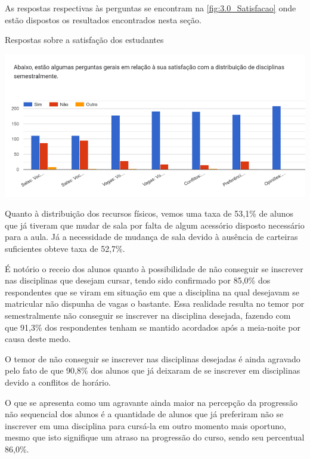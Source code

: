 As respostas respectivas às perguntas se encontram na \autoref{fig:3.0_Satisfacao} onde estão dispostos os resultados encontrados nesta seção.

\begin{MyCenteredFigure}
  \caption{Respostas sobre a satisfação dos estudantes}
  \label{fig:3.0_Satisfacao}
  \includegraphics[width=\textwidth]{files/img/2.02!3-organizacao/2.02!3.1.4-forms/3.0-Satisfacao}
\end{MyCenteredFigure} %

Quanto à distribuição dos recursos físicos, vemos uma taxa de 53,1\% de alunos que já tiveram que mudar de sala por falta de algum acessório disposto necessário para a aula. Já a necessidade de mudança de sala devido à ausência de carteiras suficientes obteve taxa de 52,7\%.

É notório o receio dos alunos quanto à possibilidade de não conseguir se inscrever nas disciplinas que desejam cursar, tendo sido confirmado por 85,0\% dos respondentes que se viram em situação em que a disciplina na qual desejavam se matricular não dispunha de vagas o bastante. Essa realidade resulta no temor por semestralmente não conseguir se inscrever na disciplina desejada, fazendo com que 91,3\% dos respondentes tenham se mantido acordados após a meia-noite por causa deste medo.

O temor de não conseguir se inscrever nas disciplinas desejadas é ainda agravado pelo fato de que 90,8\% dos alunos que já deixaram de se inscrever em disciplinas devido a conflitos de horário.

O que se apresenta como um agravante ainda maior na percepção da progressão não sequencial dos alunos é a quantidade de alunos que já preferiram não se inscrever em uma disciplina para cursá-la em outro momento mais oportuno, mesmo que isto signifique um atraso na progressão do curso, sendo seu percentual 86,0\%.

